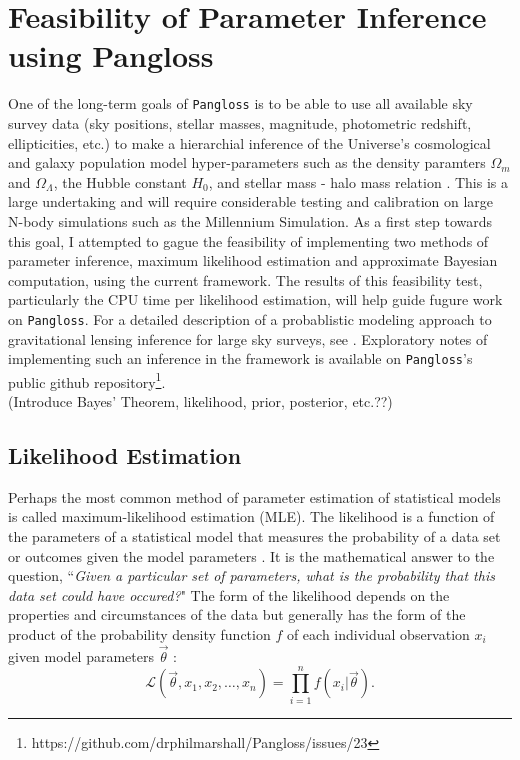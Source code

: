 \documentclass[%
 reprint,
 amsmath,amssymb,
 aps,nofootinbib
]{revtex4-1}
\begin{document}
\section{Feasibility of Parameter Inference using Pangloss} \label{feasibility}

One of the long-term goals of \texttt{Pangloss} is to be able to use all available sky survey data (sky positions, stellar masses, magnitude, photometric redshift, ellipticities, etc.) to make a hierarchial inference of the Universe's cosmological and galaxy population model hyper-parameters such as the density paramters $\Omega_m$ and $\Omega_\Lambda$, the Hubble constant $H_0$, and stellar mass - halo mass relation \cite{smhr}. This is a large undertaking and will require considerable testing and calibration on large N-body simulations such as the Millennium Simulation. As a first step towards this goal, I attempted to gague the feasibility of implementing two methods of parameter inference, maximum likelihood estimation and approximate Bayesian computation, using the current framework. The results of this feasibility test, particularly the CPU time per likelihood estimation, will help guide fugure work on \texttt{Pangloss}. For a detailed description of a probablistic modeling approach to gravitational lensing inference for large sky surveys, see \cite{grav_lens_inference}. Exploratory notes of implementing such an inference in the framework is available on \texttt{Pangloss}'s public github repository\footnote{https://github.com/drphilmarshall/Pangloss/issues/23}.\\

(Introduce Bayes' Theorem, likelihood, prior, posterior, etc.??)


\subsection{Likelihood Estimation} \label{mle}

Perhaps the most common method of parameter estimation of statistical models is called maximum-likelihood estimation (MLE). The likelihood is a function of the parameters of a statistical model that measures the probability of a data set or outcomes given the model parameters \cite{??}. It is the mathematical answer to the question, ``\textit{Given a particular set of parameters, what is the probability that this data set could have occured?}" The form of the likelihood depends on the properties and circumstances of the data but generally has the form of the product of the probability density function $f$ of each individual observation $x_i$ given model parameters $\vec{\theta}$ \cite{likelihood}:
\begin{equation}
\mathcal{L}(\vec{\theta},x_1,x_2,\ldots,x_n)=\prod_{i=1}^nf(x_i|\vec{\theta}).
\end{equation}
\end{document}
